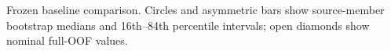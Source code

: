 Frozen baseline comparison. Circles and asymmetric bars show source-member bootstrap medians and 16th--84th percentile intervals; open diamonds show nominal full-OOF values.
